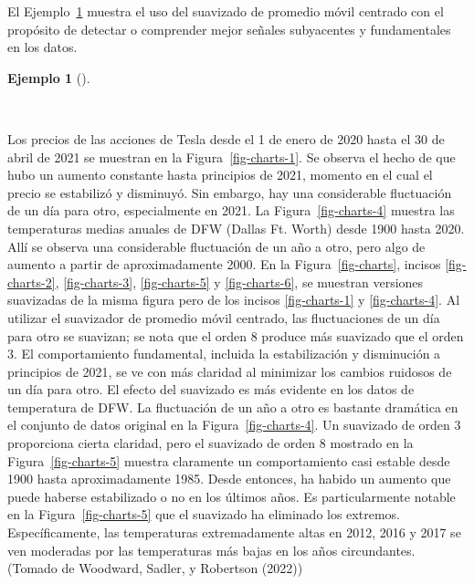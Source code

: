 \documentclass[
  us-letterpaper,
]{scrreprt}
\theoremstyle{plain}
\theoremstyle{definition}
\theoremstyle{definition}
\newtheorem{example}{Ejemplo}[chapter]
\theoremstyle{plain}
\theoremstyle{remark}
\begin{document}
El Ejemplo~\ref{exm-ejem} muestra el uso del suavizado de promedio móvil
centrado con el propósito de detectar o comprender mejor señales
subyacentes y fundamentales en los datos.

\begin{example}[]\protect\hypertarget{exm-ejem}{}\label{exm-ejem}

~

\begin{tcolorbox}[enhanced jigsaw, bottomtitle=1mm, coltitle=black, breakable, leftrule=.75mm, left=2mm, rightrule=.15mm, titlerule=0mm, toprule=.15mm, toptitle=1mm, colback=white, colframe=quarto-callout-caution-color-frame, title={\textbf{\emph{Suavizando los datos de temperatura de Tesla y DFW.}}}, colbacktitle=quarto-callout-caution-color!10!white, arc=.35mm, bottomrule=.15mm, opacitybacktitle=0.6, opacityback=0]

Los precios de las acciones de Tesla desde el 1 de enero de 2020 hasta
el 30 de abril de 2021 se muestran en la Figura~\ref{fig-charts-1}. Se
observa el hecho de que hubo un aumento constante hasta principios de
2021, momento en el cual el precio se estabilizó y disminuyó. Sin
embargo, hay una considerable fluctuación de un día para otro,
especialmente en 2021. La Figura~\ref{fig-charts-4} muestra las
temperaturas medias anuales de DFW (Dallas Ft. Worth) desde 1900 hasta
2020. Allí se observa una considerable fluctuación de un año a otro,
pero algo de aumento a partir de aproximadamente 2000. En la
Figura~\ref{fig-charts}, incisos \ref{fig-charts-2}, \ref{fig-charts-3},
\ref{fig-charts-5} y \ref{fig-charts-6}, se muestran versiones
suavizadas de la misma figura pero de los incisos \ref{fig-charts-1} y
\ref{fig-charts-4}. Al utilizar el suavizador de promedio móvil
centrado, las fluctuaciones de un día para otro se suavizan; se nota que
el orden 8 produce más suavizado que el orden 3. El comportamiento
fundamental, incluida la estabilización y disminución a principios de
2021, se ve con más claridad al minimizar los cambios ruidosos de un día
para otro. El efecto del suavizado es más evidente en los datos de
temperatura de DFW. La fluctuación de un año a otro es bastante
dramática en el conjunto de datos original en la
Figura~\ref{fig-charts-4}. Un suavizado de orden 3 proporciona cierta
claridad, pero el suavizado de orden 8 mostrado en la
Figura~\ref{fig-charts-5} muestra claramente un comportamiento casi
estable desde 1900 hasta aproximadamente 1985. Desde entonces, ha habido
un aumento que puede haberse estabilizado o no en los últimos años. Es
particularmente notable en la Figura~\ref{fig-charts-5} que el suavizado
ha eliminado los extremos. Específicamente, las temperaturas
extremadamente altas en 2012, 2016 y 2017 se ven moderadas por las
temperaturas más bajas en los años circundantes. (Tomado de Woodward,
Sadler, y Robertson (2022))


\end{tcolorbox}
\end{example}
\end{document}

